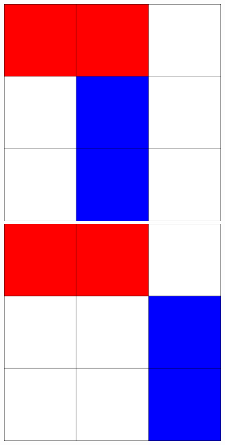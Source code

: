 \documentclass[12pt]{ctexart}
\begin{document}
	\begin{figure}[htbp]
		\centering
		\begin{minipage}[t]{0.3\textwidth}
			\centering
			\includegraphics{pictures/1-1.png}
			\caption{}
		\end{minipage}
		\begin{minipage}[t]{0.3\textwidth}
			\centering
			\includegraphics{pictures/1-2.png}

\end{minipage}
\end{figure}
\end{document}
